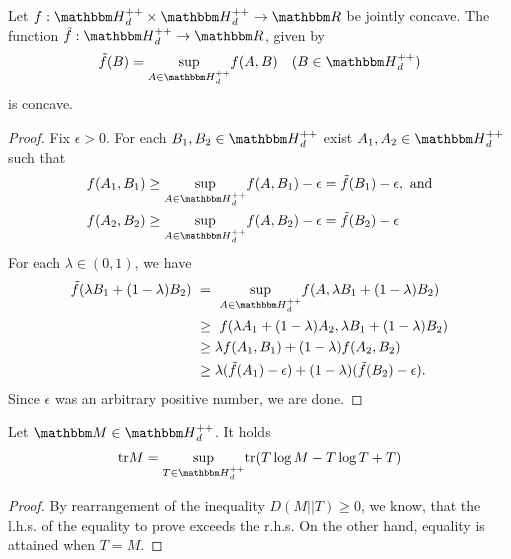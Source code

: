 \begin{lemma} \label{lemma:joint_concavity_implies_partial_concavity}
  Let $f: \bbmH_d^{++} \times \bbmH_d^{++} \rightarrow \bbmR$ be jointly concave. The function $\tilde{f}: \bbmH_d^{++} \rightarrow \bbmR$, given by
  \begin{align}
    \tilde{f}(B) = \underset{A \in \bbmH_d^{++}}{\sup} f(A,B) &  & (B \in \bbmH_d^{++})
  \end{align}
  is concave.
\end{lemma}
\begin{proof}
  Fix $\epsilon > 0$. For each $B_1,B_2 \in \bbmH_d^{++}$ exist $A_1, A_2 \in \bbmH_d^{++}$ such that
  \begin{align}
    f(A_1,B_1) & \geq \underset{A \in \bbmH_d^{++}}{\sup} f(A,B_1) - \epsilon = \tilde{f}(B_1) - \epsilon, \ \text{and} \\
    f(A_2,B_2) & \geq \underset{A \in \bbmH_d^{++}}{\sup} f(A,B_2) - \epsilon = \tilde{f}(B_2) - \epsilon
  \end{align}
  For each $\lambda \in (0,1)$, we have
  \begin{align}
    \tilde{f}(\lambda B_1 + (1- \lambda) B_2) \
     & = \ \underset{A \in \bbmH_d^{++}}{\sup} f(A, \lambda B_1 + (1 - \lambda) B_2)          \\
     & \geq \ f(\lambda A_1 + (1-\lambda) A_2, \lambda B_1 + (1 - \lambda) B_2)               \\
     & \geq \lambda f(A_1,B_1) + (1 - \lambda) f(A_2,B_2)                                     \\
     & \geq \lambda (\tilde{f}(A_1) - \epsilon) + (1 - \lambda) (\tilde{f}(B_2) -  \epsilon).
  \end{align}
  Since $\epsilon$ was an arbitrary positive number, we are done.
\end{proof}
\begin{lemma}\label{lemma:trace_variational}
  Let $\bbmM \in \bbmH_d^{++}$. It holds
  \begin{align}
    \tr M = \underset{T \in \bbmH_d^{++}}{\sup} \tr(T \log M - T \log T +T)
  \end{align}
\end{lemma}
\begin{proof}
  By rearrangement of the inequality $D(M||T) \geq 0$, we know, that the l.h.s. of the equality to prove exceeds the r.h.s. On the other hand, equality is attained
  when $T = M$.
\end{proof}
